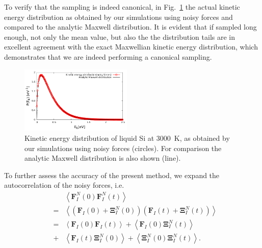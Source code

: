 \documentclass[format=acmsmall,review,timestamp,urlbreakonhyphens]{acmart}
\begin{document}
To verify that the sampling is indeed canonical, in Fig.~\ref{Fig3} the actual kinetic energy distribution as obtained by our simulations using noisy forces and compared to the analytic Maxwell distribution. It is evident that if sampled long enough, not only the mean value, but also the the distribution tails are in excellent agreement with the exact Maxwellian kinetic energy distribution, which demonstrates that we are indeed performing a canonical sampling.
\begin{figure}%
\begin{center}
\includegraphics[width=0.475\textwidth]
{figures/maxwelldistribution_new.pdf}
\end{center}
\caption{\label{Fig3}
Kinetic energy distribution of liquid Si at 3000~K, as obtained by our simulations using noisy forces (circles). For comparison the analytic Maxwell distribution is also shown (line).
} \end{figure}
To further assess the accuracy of the present method, we expand the autocorrelation of the noisy forces, i.e.
\begin{subequations}
\begin{eqnarray}
  && \left \langle \textbf{F}_{I}^{N}\left ( 0 \right )\textbf{F}_{I}^{N}\left ( t \right )\right \rangle \\
  &=& \left \langle \left ( \textbf{F}_{I}\left ( 0 \right ) + \mathbf{\Xi } _{I}^{N} \left(0 \right )\right) \left( \textbf{F}_{I}\left ( t \right )+\mathbf{\Xi } _{I}^{N}\left ( t \right )\right) \right \rangle \\
  &=& \left \langle \textbf{F}_{I}\left ( 0 \right ) \textbf{F}_{I}\left ( t \right )\right \rangle + \left \langle \textbf{F}_{I}\left ( 0 \right ) \mathbf{\Xi } _{I}^{N}\left(t \right )\right \rangle \label{AutoCorr} \\
  &+& \left \langle \textbf{F}_{I}\left ( t \right ) \mathbf{\Xi } _{I}^{N}\left(0 \right )\right \rangle + \left \langle \mathbf{\Xi } _{I}^{N}\left(0 \right ) \mathbf{\Xi } _{I}^{N}\left(t \right )\right \rangle.  \nonumber
\end{eqnarray}
\end{subequations}
\end{document}
